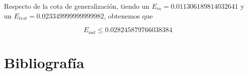 Respecto de la cota de generalización, tiendo un $E_{in}= 0.011306189814032641$ y un $E_{test} = 0.023349999999999982$, obtenemos que

$$E_{out} \leq 0.028245879766038384$$

\newpage
\section{Bibliografía}




